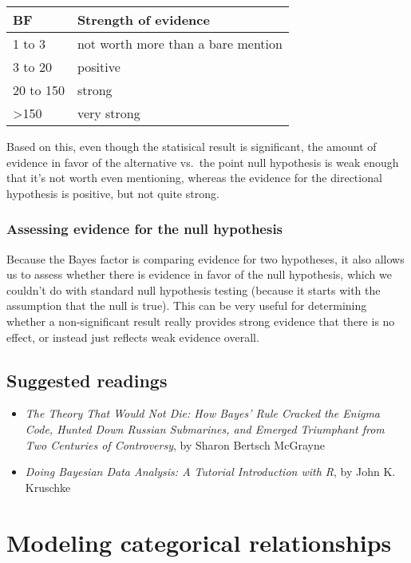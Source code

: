 \documentclass[]{book}
\providecommand{\tightlist}{%
  \setlength{\itemsep}{0pt}\setlength{\parskip}{0pt}}
\theoremstyle{definition}
\theoremstyle{definition}
\theoremstyle{definition}
\theoremstyle{remark}
\begin{document}
\begin{longtable}[]{@{}ll@{}}
\toprule
BF & Strength of evidence\tabularnewline
\midrule
\endhead
1 to 3 & not worth more than a bare mention\tabularnewline
3 to 20 & positive\tabularnewline
20 to 150 & strong\tabularnewline
\textgreater{}150 & very strong\tabularnewline
\bottomrule
\end{longtable}

Based on this, even though the statisical result is significant, the
amount of evidence in favor of the alternative vs.~the point null
hypothesis is weak enough that it's not worth even mentioning, whereas
the evidence for the directional hypothesis is positive, but not quite
strong.

\subsection{Assessing evidence for the null
hypothesis}\label{assessing-evidence-for-the-null-hypothesis}

Because the Bayes factor is comparing evidence for two hypotheses, it
also allows us to assess whether there is evidence in favor of the null
hypothesis, which we couldn't do with standard null hypothesis testing
(because it starts with the assumption that the null is true). This can
be very useful for determining whether a non-significant result really
provides strong evidence that there is no effect, or instead just
reflects weak evidence overall.

\section{Suggested readings}\label{suggested-readings-8}

\begin{itemize}
\tightlist
\item
  \emph{The Theory That Would Not Die: How Bayes' Rule Cracked the
  Enigma Code, Hunted Down Russian Submarines, and Emerged Triumphant
  from Two Centuries of Controversy}, by Sharon Bertsch McGrayne
\item
  \emph{Doing Bayesian Data Analysis: A Tutorial Introduction with R},
  by John K. Kruschke
\end{itemize}

\chapter{Modeling categorical
relationships}\label{modeling-categorical-relationships}
\end{document}
